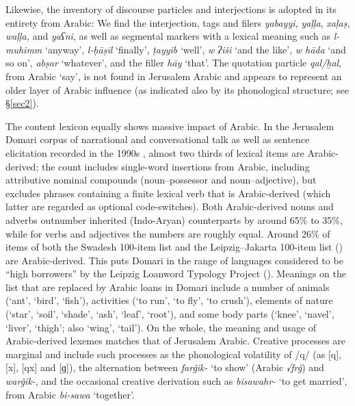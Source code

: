 \documentclass[output=paper]{langsci/langscibook}
\begin{document}
Likewise, the inventory of discourse particles and interjections is adopted in its entirety from Arabic: We find the interjection, tags and filers \textit{yabayyi,} \textit{yaḷḷa}, \textit{xaḷaṣ, waḷḷa,} {{and}} \textit{yaʕni}, as well as segmental markers with a lexical meaning such as \textit{l\nobreakdash-muhimm} ‘anyway’, \textit{l-ḥāṣil} ‘finally’, \textit{ṭayyib} ‘well’, \textit{w ʔiši} ‘and the like’, \textit{w hāda} ‘and so on’, \textit{abṣar} ‘whatever’, and the filler \textit{hāy} ‘that’. The quotation particle \textit{qal/ḫal}, from Arabic ‘say’, is not found in Jerusalem Arabic and appears to represent an older layer of Arabic influence (as indicated also by its phonological structure; see §\ref{sec2}). 

The content lexicon equally shows massive impact of Arabic. In the Jerusalem Domari corpus of narrational and conversational talk as well as sentence elicitation recorded in the 1990s \citep{Matras2012}, almost two thirds of lexical items are Arabic-derived; the count includes single-word insertions from Arabic, including attributive nominal compounds (noun–possessor and noun–adjective), but excludes phrases containing a finite lexical verb that is Arabic-derived (which latter are regarded as optional code-switches). Both Arabic-derived nouns and adverbs outnumber inherited (Indo-Aryan) counterparts by around 65\% to 35\%, while for verbs and adjectives the numbers are roughly equal. Around 26\% of items of both the Swadesh 100-item list and the Leipzig–Jakarta 100-item list (\citealt{HaspelmathTadmor2009}) are Arabic-derived. This puts Domari in the range of languages considered to be ``high borrowers'' by the Leipzig Loanword Typology Project (\citealt{HaspelmathTadmor2009}). Meanings on the list that are replaced by Arabic loans in Domari include a number of animals (‘ant’, ‘bird’, ‘fish’), activities (‘to run’, ‘to fly’, ‘to crush’), elements of nature (‘star’, ‘soil’, ‘shade’, ‘ash’, ‘leaf’, ‘root’), and some body parts (‘knee’, ‘navel’, ‘liver’, ‘thigh’; also ‘wing’, ‘tail’). On the whole, the meaning and usage of Arabic-derived lexemes matches that of Jerusalem Arabic. Creative processes are marginal and include such processes as the phonological volatility of /q/ (as [q], [x], [qx] and [ɡ]), the alternation between \textit{farǧik-} ‘to show’ (Arabic \textit{√frǧ}) and \textit{warǧik-}, and the occasional creative derivation such as \textit{bisawahr-} ‘to get married’, from Arabic \textit{bi-sawa} ‘together’. 
\end{document}

